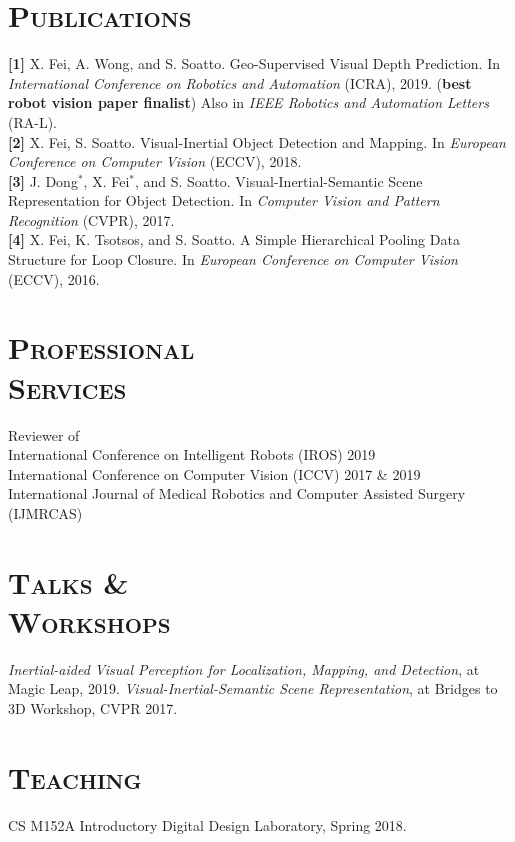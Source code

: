 \documentclass[margin, line, 10pt]{res} %
\begin{document}
\begin{resume}
\section{\textsc{Publications}}
\textbf{[1]} X. Fei, A. Wong, and S. Soatto. Geo-Supervised Visual Depth Prediction. 
In \textit{International Conference on Robotics and Automation} (ICRA), 2019. 
(\textbf{best robot vision paper finalist})
Also in \textit{IEEE Robotics and Automation Letters} (RA-L).\\
\textbf{[2]} X. Fei, S. Soatto. Visual-Inertial Object Detection and Mapping. 
In \textit{European Conference on Computer Vision} (ECCV), 2018.\\
\textbf{[3]} J. Dong$^*$, X. Fei$^*$, and S. Soatto. Visual-Inertial-Semantic Scene Representation for Object Detection. 
In \textit{Computer Vision and Pattern Recognition} (CVPR), 2017.\\
\textbf{[4]} X. Fei, K. Tsotsos, and S. Soatto. A Simple Hierarchical Pooling Data Structure for Loop Closure. 
In \textit{European Conference on Computer Vision} (ECCV), 2016.

\section{\textsc{Professional\\Services}}
Reviewer of \\
International Conference on Intelligent Robots (IROS) 2019 \\
International Conference on Computer Vision (ICCV) 2017 \& 2019\\
International Journal of Medical Robotics and Computer Assisted Surgery (IJMRCAS)

\section{\textsc{Talks \&\\Workshops}}
\textit{Inertial-aided Visual Perception for Localization, Mapping, and Detection}, at Magic Leap, 2019.
\textit{Visual-Inertial-Semantic Scene Representation}, at Bridges to 3D Workshop, CVPR 2017.

\section{\textsc{Teaching}}
CS M152A Introductory Digital Design Laboratory, Spring 2018.


\end{resume}
\end{document}
